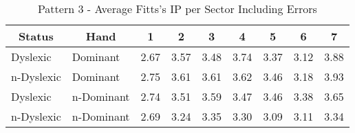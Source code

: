	\begin{table}[h]
		\centering
		\caption{Pattern 3 - Average Fitts's IP per Sector Including Errors}
		\label{tab_pat_3_ip_all}
		\begin{tabularx}{\textwidth}{|l|l|X|X|X|X|X|X|X|}
			\hline
			\multicolumn{1}{|c|}{\textbf{Status}} & \multicolumn{1}{c|}{\textbf{Hand}} & \multicolumn{1}{c|}{\textbf{1}} & \multicolumn{1}{c|}{\textbf{2}} & \multicolumn{1}{c|}{\textbf{3}} & \multicolumn{1}{c|}{\textbf{4}} & \multicolumn{1}{c|}{\textbf{5}} & \multicolumn{1}{c|}{\textbf{6}} & \multicolumn{1}{c|}{\textbf{7}} \\ \hline
			Dyslexic                              & Dominant                           & 2.67       & 3.57       & 3.48       & 3.74       & 3.37       & 3.12       & 3.88       \\ \hline
			n-Dyslexic                          & Dominant                           & 2.75       & 3.61       & 3.61       & 3.62       & 3.46       & 3.18       & 3.93       \\ \hline
			Dyslexic                              & n-Dominant                       & 2.74       & 3.51       & 3.59       & 3.47       & 3.46       & 3.38       & 3.65       \\ \hline
			n-Dyslexic                          & n-Dominant                       & 2.69       & 3.24       & 3.35       & 3.30       & 3.09       & 3.11       & 3.34       \\ \hline
		\end{tabularx}
	\end{table}


